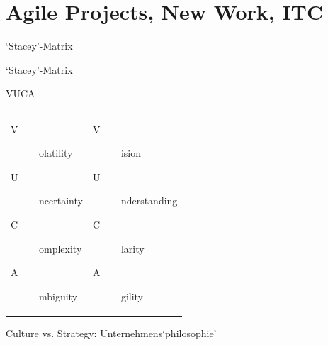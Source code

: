 \section{Agile Projects, New Work, ITC}


\begin{frame}{`Stacey'-Matrix}
        \end{frame}

\begin{frame}{`Stacey'-Matrix}        
        
\end{frame}

\begin{frame}{VUCA}
    \begin{tabular}{ll}
    \begin{minipage}{4cm}
        \begin{description}
            \item[V]olatility
            \item[U]ncertainty
            \item[C]omplexity
            \item[A]mbiguity
        \end{description}
    \end{minipage}
         &  
    \begin{minipage}{6cm}
        \begin{description}
            \item[V]ision
            \item[U]nderstanding
            \item[C]larity
            \item[A]gility
        \end{description}
    \end{minipage}
\end{tabular}
\end{frame}


\begin{frame}{Culture vs. Strategy: Unternehmens`philosophie'}
    
\end{frame}



